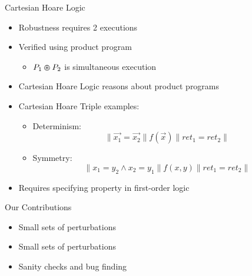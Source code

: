 \documentclass[usenames,dvipsnames]{beamer}
\begin{document}
\begin{frame}{Cartesian Hoare Logic}
    \begin{itemize}
        \item<1-> Robustness requires 2 executions
        \item<2-> Verified using product program
            \begin{itemize}
                \item<3-> \(P_{1} \varoast P_{2}\) is simultaneous execution
            \end{itemize}
        \item<4-> Cartesian Hoare Logic reasons about product programs
        \item<5-> Cartesian Hoare Triple examples:
            \begin{itemize}
                \item<6-> Determinism: \[\|\vec{x_{1}} = \vec{x_{2}}\|f(\vec{x})\|ret_{1} = ret_{2}\|\]
                \item<7-> Symmetry: \[\|x_{1} = y_{2} \wedge x_{2} = y_{1}\|f(x,y)\|ret_{1} = ret_{2}\|\]
            \end{itemize}
        \item<8-> Requires specifying property in first-order logic
    \end{itemize}
\end{frame}


\begin{frame}[fragile]{Our Contributions}
  \begin{itemize}
    \item Small sets of perturbations 
    \item Small sets of perturbations 
    \vfill
    \item Sanity checks and bug finding
  \end{itemize}
\end{frame}
\end{document}
